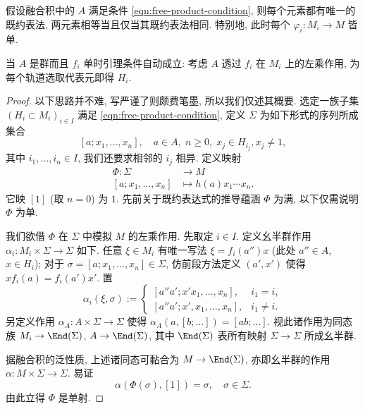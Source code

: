 \begin{lemma}
	假设融合积中的 $A$ 满足条件 \eqref{eqn:free-product-condition}, 则每个元素都有唯一的既约表法, 两元素相等当且仅当其既约表法相同. 特别地, 此时每个 $\varphi_i: M_i \to M$ 皆单.
\end{lemma}
当 $A$ 是群而且 $f_i$ 单时引理条件自动成立: 考虑 $A$ 透过 $f_i$ 在 $M_i$ 上的左乘作用, 为每个轨道选取代表元即得 $H_i$.

\begin{proof}
	以下思路并不难, 写严谨了则颇费笔墨, 所以我们仅述其概要. 选定一族子集 $(H_i \subset M_i)_{i \in I}$ 满足 \eqref{eqn:free-product-condition}, 定义 $\Sigma$ 为如下形式的序列所成集合
	\[ [a; x_1, \ldots, x_n], \quad a \in A, \; n \geq 0, \; x_j \in H_{i_j}, x_j \neq 1, \]
	其中 $i_1, \ldots, i_n \in I$, 我们还要求相邻的 $i_j$ 相异. 定义映射
	\begin{align*}
		\Phi: \Sigma & \longrightarrow M \\
		[a; x_1, \ldots, x_n] & \longmapsto h(a)x_1 \cdots x_n.
	\end{align*}
	它映 $[1]$ (取 $n=0$) 为 $1$. 先前关于既约表达式的推导蕴涵 $\Phi$ 为满, 以下仅需说明 $\Phi$ 为单.

	我们欲借 $\Phi$ 在 $\Sigma$ 中模拟 $M$ 的左乘作用. 先取定 $i \in I$. 定义幺半群作用 $\alpha_i: M_i \times \Sigma \to \Sigma$ 如下. 任意 $\xi \in M_i$ 有唯一写法 $\xi = f_i(a'') x$ (此处 $a'' \in A$, $x \in H_i$); 对于 $\sigma = [a; x_1, \ldots, x_n] \in \Sigma$, 仿前段方法定义 $(a', x')$ 使得 $x f_i(a) = f_i(a')x'$. 置
	\[ \alpha_i(\xi, \sigma) :=
		\begin{cases}
			[a'' a'; x'x_1, \ldots, x_n], & i_1 = i, \\
			[a'' a'; x', x_1, \ldots, x_n], & i_1 \neq i.
	\end{cases} \]
	另定义作用 $\alpha_A: A \times \Sigma \to \Sigma$ 使得 $\alpha_A(a, [b; \ldots]) = [ab; \ldots]$. 视此诸作用为同态族 $M_i \to \End(\Sigma)$, $A \to \End(\Sigma)$, 其中 $\End(\Sigma)$ 表所有映射 $\Sigma \to \Sigma$ 所成幺半群.

	据融合积的泛性质, 上述诸同态可黏合为 $M \to \End(\Sigma)$, 亦即幺半群的作用 $\alpha: M \times \Sigma \to \Sigma$. 易证
	\[ \alpha(\Phi(\sigma), [1]) = \sigma, \quad \sigma \in \Sigma. \]
	由此立得 $\Phi$ 是单射.
\end{proof}

